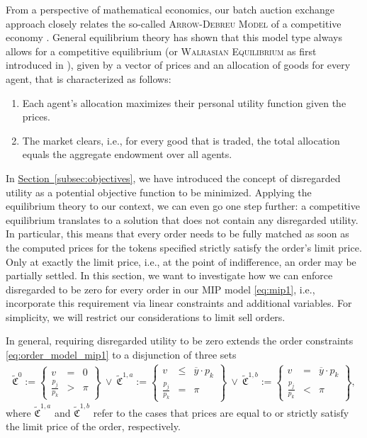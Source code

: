 \documentclass[11pt,parskip=full]{scrartcl}%
\newcommand*{\ie}{i.e., }
\newcommand*{\secref}[1]{\hyperref[{#1}]{Section~\ref*{#1}}}
\begin{document}
From a perspective of mathematical economics, our batch auction exchange approach closely relates the so-called \textsc{Arrow-Debreu Model} of a competitive economy \cite{ARROW-DEBREU_1954:existence-equilibrium}.
General equilibrium theory has shown that this model type always allows for a competitive equilibrium (or \textsc{Walrasian Equilibrium} as first introduced in \cite{WALRAS_1896:elements}), given by a vector of prices and an allocation of goods for every agent, that is characterized as follows:
\begin{enumerate}
  \item Each agent's allocation maximizes their personal utility function given the prices.
  \item The market clears, \ie for every good that is traded, the total allocation equals the aggregate endowment over all agents.
\end{enumerate}

In \secref{subsec:objectives}, we have introduced the concept of disregarded utility as a potential objective function to be minimized.
Applying the equilibrium theory to our context, we can even go one step further: a competitive equilibrium translates to a solution that does not contain any disregarded utility.
In particular, this means that every order needs to be fully matched as soon as the computed prices for the tokens specified strictly satisfy the order's limit price.
Only at exactly the limit price, \ie at the point of indifference, an order may be partially settled.
In this section, we want to investigate how we can enforce disregarded to be zero for every order in our MIP model \eqref{eq:mip1}, \ie incorporate this requirement via linear constraints and additional variables.
For simplicity, we will restrict our considerations to limit sell orders.

In general, requiring disregarded utility to be zero extends the order constraints \eqref{eq:order_model_mip1} to a disjunction of three sets
\begin{align}
  \tilde{\mathfrak{C}}^0 := \left\{
  \begin{array}{rll}
    v &= & 0 \\[1mm]
    \frac{p_j}{p_k} &> & \pi
  \end{array}
  \right\}
  \>
  \lor
  \>
  \tilde{\mathfrak{C}}^{1,a} := \left\{
  \begin{array}{rlll}
    v &\le & \overline{y} \cdot p_k \\[1mm]
    \frac{p_j}{p_k} &= & \pi
  \end{array}
  \right\}
  \>
  \lor
  \>
  \tilde{\mathfrak{C}}^{1,b} := \left\{
  \begin{array}{rlll}
    v &= & \overline{y} \cdot p_k \\[1mm]
    \frac{p_j}{p_k} &< & \pi
  \end{array}
  \right\},
  \label{eq:order_model_mip1_zero_disregarded_utility}
\end{align}
where $\tilde{\mathfrak{C}}^{1,a}$ and $\tilde{\mathfrak{C}}^{1,b}$ refer to the cases that prices are equal to or strictly satisfy the limit price of the order, respectively.
\end{document}
